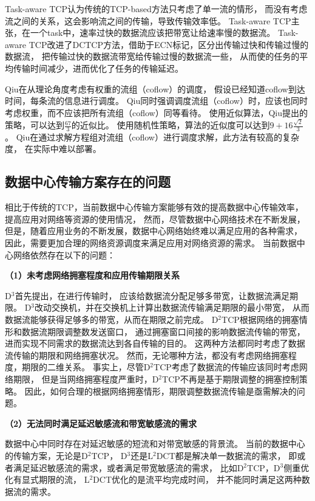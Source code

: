Task-aware TCP\cite{liu2017task}认为传统的TCP-based方法只考虑了单一流的情形，
而没有考虑流之间的关系，这会影响流之间的传输，导致传输效率低。
Task-aware TCP主张，在一个task中，速率过快的数据流应该把带宽让给速率慢的数据流。
Task-aware TCP\cite{liu2017task}改进了DCTCP方法，借助于ECN标记，区分出传输过快和传输过慢的数据流，
把传输过快的数据流带宽给传输过慢的数据流一些，
从而使的任务的平均传输时间减少，进而优化了任务的传输延迟。




Qiu在\cite{qiu2015minimizing}从理论角度考虑有权重的流组（coflow）的调度，
假设已经知道coflow到达时间，每条流的信息进行调度。
Qiu同时强调调度流组（coflow）时，应该也同时考虑权重，而不应该把所有流组（coflow）同等看待。
使用近似算法，Qiu提出的策略，可以达到$\frac{67}{3}$的近似比。
使用随机性策略，算法的近似度可以达到$9+16\frac{\sqrt{2}}{3}$。
Qiu在\cite{qiu2015minimizing}通过求解方程组对流组（coflow）进行调度求解，此方法有较高的复杂度，
在实际中难以部署。


\subsection{数据中心传输方案存在的问题}
相比于传统的TCP，当前数据中心传输方案能够有效的提高数据中心传输效率，
提高应用对网络等资源的使用情况，
然而，尽管数据中心网络技术在不断发展，
但是，随着应用业务的不断发展，数据中心网络始终难以满足应用的各种需求，
因此，需要更加合理的网络资源调度来满足应用对网络资源的需求。
当前数据中心网络依然存在以下的问题：

\textbf{（1）未考虑网络拥塞程度和应用传输期限关系}

D$^3$首先提出，在进行传输时，
应该给数据流分配足够多带宽，让数据流满足期限。
D$^3$改动交换机，并在交换机上计算出数据流传输满足期限的最小带宽，
从而数据流能够获得足够多的带宽，从而在期限之前完成。
D$^2$TCP根据网络的拥塞情形和数据流期限调整数发送窗口，
通过拥塞窗口间接的影响数据流传输的带宽，进而实现不同需求的数据流达到各自传输的目的。
这两种方法都同时考虑了数据流传输的期限和网络拥塞状况。
然而，无论哪种方法，都没有考虑网络拥塞程度，期限的二维关系。
事实上，尽管D$^2$TCP考虑了数据流的传输应该同时考虑网络期限，
但是当网络拥塞程度严重时，D$^2$TCP不再是基于期限调整的拥塞控制策略。
因此，如何合理的根据网络拥塞情形，期限调整数据流传输是亟需解决的问题。


\textbf{（2）无法同时满足延迟敏感流和带宽敏感流的需求}

数据中心中同时存在对延迟敏感的短流和对带宽敏感的背景流。
当前的数据中心的传输方案，无论是D$^2$TCP，
D$^3$还是L$^2$DCT都是解决单一数据流的需求，
即或者满足延迟敏感流的需求，或者满足带宽敏感流的需求，
比如D$^2$TCP，D$^3$侧重优化有显式期限的流，
L$^2$DCT优化的是流平均完成时间，
并不能同时满足这两种数据流的需求。

